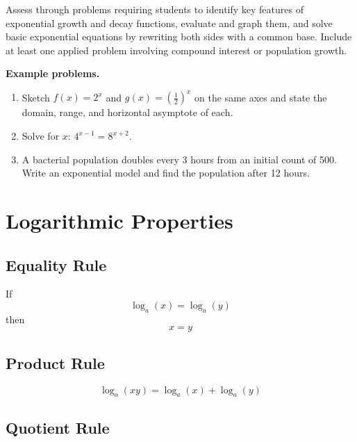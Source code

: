 Assess through problems requiring students to identify key features of exponential growth
and decay functions, evaluate and graph them, and solve basic exponential equations by
rewriting both sides with a common base. Include at least one applied problem involving
compound interest or population growth.

\textbf{Example problems.}

\begin{enumerate}
    \item Sketch $f(x) = 2^x$ and $g(x) = \left(\tfrac{1}{2}\right)^x$ on the same axes and state the domain, range, and horizontal asymptote of each.
    \item Solve for $x$: $4^{x-1} = 8^{x+2}$.
    \item A bacterial population doubles every 3 hours from an initial count of 500. Write an exponential model and find the population after 12 hours.
\end{enumerate}

\section{Logarithmic Properties}
\label{sec:loga-ebc4}
\subsection{Equality Rule}
\label{sss:equa-b299}

If
\[
\log_a(x) = \log_a(y)
\]
then
\[
x = y
\]

\subsection{Product Rule}
\label{sss:prod-1f6a}

\[
\log_a(xy) = \log_a(x) + \log_a(y)
\]

\subsection{Quotient Rule}
\label{sss:quot-e55e}

